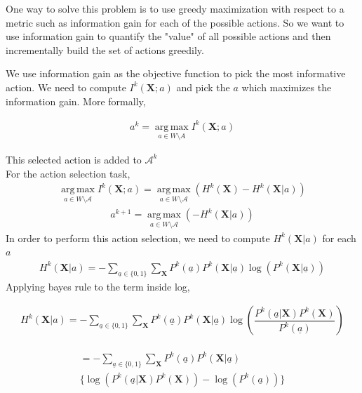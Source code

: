 \documentclass[10pt,twocolumn,letterpaper]{article}
\begin{document}
One way to solve this problem is to use greedy maximization with respect to a metric such as information gain for each of the possible actions. So we want to use information gain to quantify the "value" of all possible actions and then incrementally build the set of actions greedily.
  
We use information gain as the objective function to pick the most informative action.
We need to compute $I^{k}(\textbf{X};a)$ and pick the $a$ which maximizes the information gain. More formally,

\begin{align}
a^{k} = \operatorname*{arg\,max}_{a\in W \setminus A} I^{k}(\textbf{X};a)
\end{align}

This selected action is added to $\mathcal{A}^{k}$\\
For the action selection task,
\begin{align}
\operatorname*{arg\,max}_{a\in W \setminus{\mathcal{A}}}I^{k}(\textbf{X}; a) =\operatorname*{arg\,max}_{a\in W \setminus{\mathcal{A}}} (H^{k}(\textbf{X}) - H^{k}(\textbf{X}|a))
\end{align}
\begin{align}
a^{k+1} =\operatorname*{arg\,max}_{a\in W \setminus{\mathcal{A}}} (- H^{k}(\textbf{X}|a))
\end{align}
In order to perform this action selection, we need to compute $H^{k}(\textbf{X}|a)$ for each $a$
\begin{align}
H^{k}(\textbf{X}| a) = -\sum_{\underline{a}\in\lbrace 0 ,1 \rbrace} \sum_{\textbf{X}} P^{k}(\underline{a})P^{k}(\textbf{X}| \underline{a}) \log(P^{k}(\textbf{X}| \underline{a}))
\end{align}
Applying bayes rule to the term inside log,

\begin{align}
H^{k}(\textbf{X}| a)= -\sum_{\underline{a}\in\lbrace 0 ,1 \rbrace} \sum_{\textbf{X}} P^{k}( \underline{a})P^{k}(\textbf{X}| \underline{a}) \log(\dfrac{P^{k}( \underline{a}|\textbf{X})P^{k}(\textbf{X})}{P^{k}( \underline{a})})
\end{align}

\begin{align}
\begin{split}
 = -\sum_{\underline{a}\in\lbrace 0 ,1 \rbrace} \sum_{\textbf{X}} P^{k}( \underline{a})  P^{k}(\textbf{X}| \underline{a}) \\ \Big\lbrace\log(P^{k}( \underline{a}|\textbf{X})P^{k}(\textbf{X})) - \log(P^{k}( \underline{a}))\Big\rbrace
\end{split}
\end{align}
\end{document}
